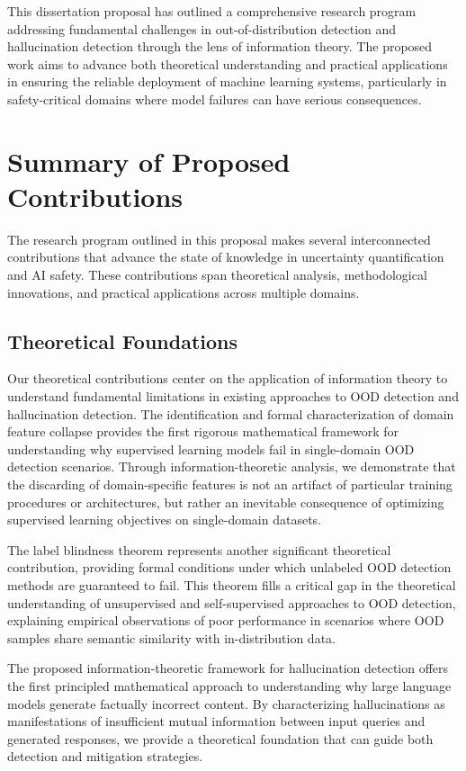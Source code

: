 \documentclass[11pt, oneside]{book}
\theoremstyle{plain}
\theoremstyle{definition}
\theoremstyle{remark}
\begin{document}
This dissertation proposal has outlined a comprehensive research program addressing fundamental challenges in out-of-distribution detection and hallucination detection through the lens of information theory. The proposed work aims to advance both theoretical understanding and practical applications in ensuring the reliable deployment of machine learning systems, particularly in safety-critical domains where model failures can have serious consequences.

\section{Summary of Proposed Contributions}

The research program outlined in this proposal makes several interconnected contributions that advance the state of knowledge in uncertainty quantification and AI safety. These contributions span theoretical analysis, methodological innovations, and practical applications across multiple domains.

\subsection{Theoretical Foundations}

Our theoretical contributions center on the application of information theory to understand fundamental limitations in existing approaches to OOD detection and hallucination detection. The identification and formal characterization of domain feature collapse provides the first rigorous mathematical framework for understanding why supervised learning models fail in single-domain OOD detection scenarios. Through information-theoretic analysis, we demonstrate that the discarding of domain-specific features is not an artifact of particular training procedures or architectures, but rather an inevitable consequence of optimizing supervised learning objectives on single-domain datasets.

The label blindness theorem represents another significant theoretical contribution, providing formal conditions under which unlabeled OOD detection methods are guaranteed to fail. This theorem fills a critical gap in the theoretical understanding of unsupervised and self-supervised approaches to OOD detection, explaining empirical observations of poor performance in scenarios where OOD samples share semantic similarity with in-distribution data.

The proposed information-theoretic framework for hallucination detection offers the first principled mathematical approach to understanding why large language models generate factually incorrect content. By characterizing hallucinations as manifestations of insufficient mutual information between input queries and generated responses, we provide a theoretical foundation that can guide both detection and mitigation strategies.
\end{document}
